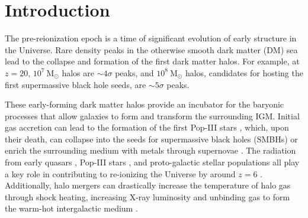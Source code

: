 
%
%

\section{Introduction}
\label{sec:2lpt--introduction}







The pre-reionization epoch is a time of significant evolution of early structure in the Universe.  Rare density peaks in the otherwise smooth dark matter (DM) sea lead to the collapse and formation of the first dark matter halos.  For example, at $z = 20$, $10^{7}~\mathrm{M}_{\odot}$ halos are $\sim 4\sigma$ peaks, and $10^{8}~\mathrm{M}_{\odot}$ halos, candidates for hosting the first supermassive black hole seeds, are $\sim 5\sigma$ peaks.

These early-forming dark matter halos provide an incubator for the baryonic processes that allow galaxies to form and transform the surrounding IGM.  Initial gas accretion can lead to the formation of the first Pop-III stars \citep{1986MNRAS.221...53C, 1997ApJ...474....1T, 2000ApJ...540...39A, 2002Sci...295...93A}, which, upon their death, can collapse into the seeds for supermassive black holes (SMBHs) \citep{2001ApJ...551L..27M, 2003MNRAS.340..647I, 2009ApJ...701L.133A, 2012ApJ...754...34J} or enrich the surrounding medium with metals through supernovae \citep{2002ApJ...567..532H, 2003ApJ...591..288H}.  The radiation from early quasars \citep{1987ApJ...321L.107S, 1999ApJ...514..648M, 2001AJ....122.2833F}, Pop-III stars \citep{1997ApJ...486..581G, 2003ApJ...584..621V, 2006ApJ...639..621A}, and proto-galactic stellar populations \citep{2012ApJ...752L...5B, 2012MNRAS.423..862K} all play a key role in contributing to re-ionizing the Universe by around $z = 6$ \citep{2001PhR...349..125B}.  Additionally, halo mergers can drastically increase the temperature of halo gas through shock heating, increasing X-ray luminosity \citep{2009MNRAS.397..190S} and unbinding gas to form the warm-hot intergalactic medium \citep{2008SSRv..134..141B, 2010MNRAS.405L..31S, 2012MNRAS.425.2974T}.





